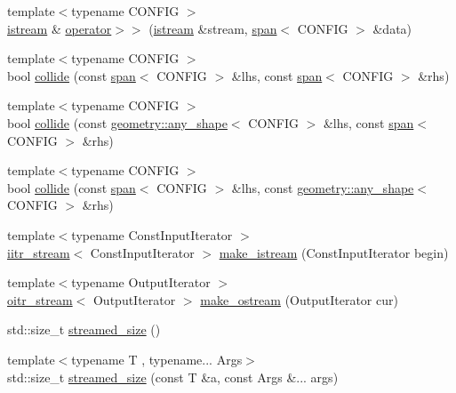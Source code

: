 \begin{DoxyCompactItemize}
\item 
{\footnotesize template$<$typename C\+O\+N\+F\+IG $>$ }\\\hyperlink{classmui_1_1istream}{istream} \& \hyperlink{namespacemui_a8800be884714254506a106cdba988528}{operator$>$$>$} (\hyperlink{classmui_1_1istream}{istream} \&stream, \hyperlink{classmui_1_1span}{span}$<$ C\+O\+N\+F\+IG $>$ \&data)
\item 
{\footnotesize template$<$typename C\+O\+N\+F\+IG $>$ }\\bool \hyperlink{namespacemui_a6765d7d1e0d21768dcaa16aab09db723}{collide} (const \hyperlink{classmui_1_1span}{span}$<$ C\+O\+N\+F\+IG $>$ \&lhs, const \hyperlink{classmui_1_1span}{span}$<$ C\+O\+N\+F\+IG $>$ \&rhs)
\item 
{\footnotesize template$<$typename C\+O\+N\+F\+IG $>$ }\\bool \hyperlink{namespacemui_a18f0ce044f4f39a91b259dd50361825f}{collide} (const \hyperlink{classmui_1_1geometry_1_1any__shape}{geometry\+::any\+\_\+shape}$<$ C\+O\+N\+F\+IG $>$ \&lhs, const \hyperlink{classmui_1_1span}{span}$<$ C\+O\+N\+F\+IG $>$ \&rhs)
\item 
{\footnotesize template$<$typename C\+O\+N\+F\+IG $>$ }\\bool \hyperlink{namespacemui_ad6de60c5a3b20c2a0733b19512cf2428}{collide} (const \hyperlink{classmui_1_1span}{span}$<$ C\+O\+N\+F\+IG $>$ \&lhs, const \hyperlink{classmui_1_1geometry_1_1any__shape}{geometry\+::any\+\_\+shape}$<$ C\+O\+N\+F\+IG $>$ \&rhs)
\item 
{\footnotesize template$<$typename Const\+Input\+Iterator $>$ }\\\hyperlink{classmui_1_1iitr__stream}{iitr\+\_\+stream}$<$ Const\+Input\+Iterator $>$ \hyperlink{namespacemui_ae8d0efd50a0aaece37066d01debfc74d}{make\+\_\+istream} (Const\+Input\+Iterator begin)
\item 
{\footnotesize template$<$typename Output\+Iterator $>$ }\\\hyperlink{classmui_1_1oitr__stream}{oitr\+\_\+stream}$<$ Output\+Iterator $>$ \hyperlink{namespacemui_a77ab20df376b43366b058222ce36fb97}{make\+\_\+ostream} (Output\+Iterator cur)
\item 
std\+::size\+\_\+t \hyperlink{namespacemui_ab958b0ec3aa4551fe288f254ef9b1c12}{streamed\+\_\+size} ()
\item 
{\footnotesize template$<$typename T , typename... Args$>$ }\\std\+::size\+\_\+t \hyperlink{namespacemui_acf2817116ca0977359f957c85e94108a}{streamed\+\_\+size} (const T \&a, const Args \&... args)

\end{DoxyCompactItemize}

